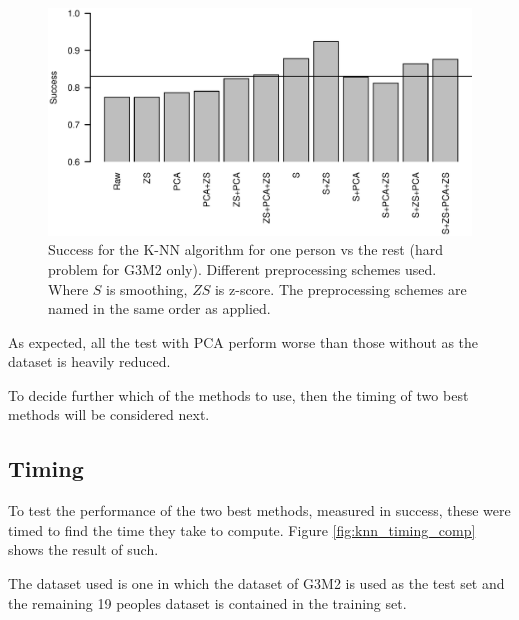 \begin{figure}[H]
\includegraphics[width = 0.95 \textwidth]{graphics/knn_zscore_3}
\caption[Success for K-NN with different preprocessing schemes. Hard problem.]{Success for the K-NN algorithm for one person vs the rest (hard problem for G3M2 only). Different preprocessing schemes used.
Where $S$ is smoothing, $ZS$ is z-score.
The preprocessing schemes are named in the same order as applied.}
\label{fig:knn_zscore_3}
\end{figure}


As expected, all the test with PCA perform worse than those without as the dataset is heavily reduced.

To decide further which of the methods to use, then the timing of two best methods will be considered next.
%


\subsection{Timing}

To test the performance of the two best methods, measured in success, these were timed to find the time they take to compute.
Figure \ref{fig:knn_timing_comp} shows the result of such.

The dataset used is one in which the dataset of G3M2 is used as the test set and the remaining 19 peoples dataset is contained in the training set.


